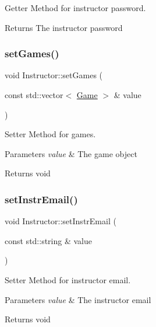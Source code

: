 Getter Method for instructor password. 

\begin{DoxyReturn}{Returns}
The instructor password 
\end{DoxyReturn}
\mbox{\label{classInstructor_a282cf5e300e5f642935d389b94f93b13}} 
\subsubsection{\texorpdfstring{set\+Games()}{setGames()}}
{\footnotesize\ttfamily void Instructor\+::set\+Games (\begin{DoxyParamCaption}\item[{const std\+::vector$<$ \hyperlink{classGame}{Game} $>$ \&}]{value }\end{DoxyParamCaption})}



Setter Method for games. 


\begin{DoxyParams}{Parameters}
{\em value} & The game object \\
\hline
\end{DoxyParams}
\begin{DoxyReturn}{Returns}
void 
\end{DoxyReturn}
\mbox{\label{classInstructor_a7983774764662f501ecda887e97038f3}} 
\subsubsection{\texorpdfstring{set\+Instr\+Email()}{setInstrEmail()}}
{\footnotesize\ttfamily void Instructor\+::set\+Instr\+Email (\begin{DoxyParamCaption}\item[{const std\+::string \&}]{value }\end{DoxyParamCaption})}



Setter Method for instructor email. 


\begin{DoxyParams}{Parameters}
{\em value} & The instructor email \\
\hline
\end{DoxyParams}
\begin{DoxyReturn}{Returns}
void 
\end{DoxyReturn}
\mbox{\label{classInstructor_a836c0cb8195550308e7dcc04c7b767a2}} 
